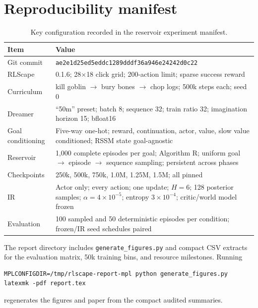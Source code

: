 \documentclass[10pt]{article}
\begin{document}
\section{Reproducibility manifest}

\begin{table}[H]
\centering
\small
\caption{Key configuration recorded in the reservoir experiment manifest.}
\begin{tabular}{>{\raggedright\arraybackslash}p{.28\linewidth}p{.62\linewidth}}
\toprule
Item & Value \\
\midrule
Git commit & \texttt{ae2e1d25ed5eddc1289dddf36a946e24242d0c22} \\
RLScape & 0.1.6; 28$\times$18 click grid; 200-action limit; sparse success reward \\
Curriculum & kill goblin $\rightarrow$ bury bones $\rightarrow$ chop logs; 500k steps each; seed 0 \\
Dreamer & ``50m'' preset; batch 8; sequence 32; train ratio 32; imagination horizon 15; bfloat16 \\
Goal conditioning & Five-way one-hot; reward, continuation, actor, value, slow value conditioned; RSSM state goal-agnostic \\
Reservoir & 1,000 complete episodes per goal; Algorithm R; uniform goal $\rightarrow$ episode $\rightarrow$ sequence sampling; persistent across phases \\
Checkpoints & 250k, 500k, 750k, 1.0M, 1.25M, 1.5M; all pinned \\
IR & Actor only; every action; one update; $H=6$; 128 posterior samples; $\alpha=4\times10^{-5}$; entropy $3\times10^{-4}$; critic/world model frozen \\
Evaluation & 100 sampled and 50 deterministic episodes per condition; frozen/IR seed schedules paired \\
\bottomrule
\end{tabular}
\end{table}

The report directory includes \texttt{generate\_figures.py} and compact CSV extracts for the evaluation matrix, 50k training bins, and resource milestones. Running
\begin{verbatim}
MPLCONFIGDIR=/tmp/rlscape-report-mpl python generate_figures.py
latexmk -pdf report.tex
\end{verbatim}
regenerates the figures and paper from the compact audited summaries.



\end{document}

